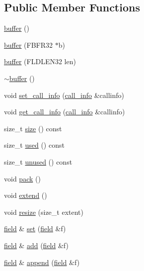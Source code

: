 \subsection*{Public Member Functions}
\begin{DoxyCompactItemize}
\item 
\hyperlink{classatmi_1_1buffer_ab5a434d367c856f9b1b7c831b98ff0d3}{buffer} ()
\item 
\hyperlink{classatmi_1_1buffer_a5a2836413da6d30d25afa2ea242cd90d}{buffer} (F\+B\+F\+R32 $\ast$b)
\item 
\hyperlink{classatmi_1_1buffer_ae2bc183e6b0909b8155dcfa17686a574}{buffer} (F\+L\+D\+L\+E\+N32 len)
\item 
\hyperlink{classatmi_1_1buffer_aa58097eacc94f1f5cc5e99b434ec7135}{$\sim$buffer} ()
\item 
void \hyperlink{classatmi_1_1buffer_a51d14f5d63ae22666ce0d5dc46e91728}{set\+\_\+call\+\_\+info} (\hyperlink{classatmi_1_1call__info}{call\+\_\+info} \&callinfo)
\item 
void \hyperlink{classatmi_1_1buffer_a84a4bd3782f9ffafa962a2393484b0b7}{get\+\_\+call\+\_\+info} (\hyperlink{classatmi_1_1call__info}{call\+\_\+info} \&callinfo)
\item 
size\+\_\+t \hyperlink{classatmi_1_1buffer_a8228f64305e566b8133e8ee746c6d2bb}{size} () const 
\item 
size\+\_\+t \hyperlink{classatmi_1_1buffer_a4ab660c5750cb0793eb99782fd36c0fa}{used} () const 
\item 
size\+\_\+t \hyperlink{classatmi_1_1buffer_a30b054d9d60238f34463d4bcd5ac3e16}{unused} () const 
\item 
void \hyperlink{classatmi_1_1buffer_ab9294b1a1e54e35717db40cb6bbb6de1}{pack} ()
\item 
void \hyperlink{classatmi_1_1buffer_a853e2a0585dda4e23ffa04297b824afb}{extend} ()
\item 
void \hyperlink{classatmi_1_1buffer_a95d13597c2f28bfc8ee5dac4db131179}{resize} (size\+\_\+t extent)
\item 
\hyperlink{classatmi_1_1field}{field} \& \hyperlink{classatmi_1_1buffer_a1fe98844cb17328390b3d4e658bd6903}{set} (\hyperlink{classatmi_1_1field}{field} \&f)
\item 
\hyperlink{classatmi_1_1field}{field} \& \hyperlink{classatmi_1_1buffer_a5f30826d8273b619380e8b4f039af094}{add} (\hyperlink{classatmi_1_1field}{field} \&f)
\item 
\hyperlink{classatmi_1_1field}{field} \& \hyperlink{classatmi_1_1buffer_a4a9abeb69354fa575c8b27c9af170e79}{append} (\hyperlink{classatmi_1_1field}{field} \&f)

\end{DoxyCompactItemize}
